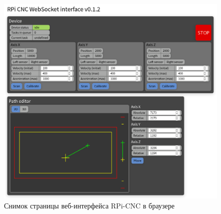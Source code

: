 \documentclass[14pt,russian,a4paper]{extarticle}
\begin{document}
\begin{figure}[h!]
    \centerline{\includegraphics[width=400pt]{media/rpicnc_web.png}}
    \caption{Снимок страницы веб-интерфейса RPi-CNC в браузере}
    \label{fig:rpicnc_web}
\end{figure}
\end{document}
